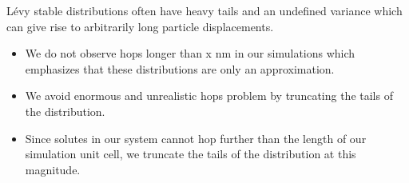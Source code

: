 \documentclass{article}
\begin{document}
  
  
  L\'evy stable distributions often have heavy tails and an undefined variance 
  which can give rise to arbitrarily long particle displacements.
  \begin{itemize}
  	\item We do not observe hops longer than x nm in our simulations which 
  	emphasizes that these distributions are only an approximation.
    \item We avoid enormous and unrealistic hops problem by truncating the tails
    of the distribution. %
    \item Since solutes in our system cannot hop further than the length of our 
    simulation unit cell, we truncate the tails of the distribution at this
    magnitude.
  \end{itemize}
  
\end{document}
